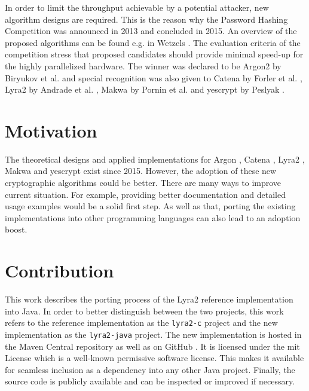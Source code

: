 In order to limit the throughput achievable by a potential attacker, new algorithm designs are required. This is the reason why the Password Hashing Competition was announced in 2013 and concluded in 2015. An overview of the proposed algorithms can be found e.g. in Wetzels \cite{wetzels:2016:phc}. The evaluation criteria of the competition stress that proposed candidates should provide minimal speed-up for the highly parallelized hardware. The winner was declared to be Argon2 by Biryukov et al. \cite{biryukov:2015:argon2} and special recognition was also given to Catena by Forler et al. \cite{forler:2013:catena}, Lyra2 by Andrade et al. \cite{andrade:2016:lyra2,marcos:2015:lyra2}, Makwa by Pornin et al. \cite{pornin:2015:makwa} and yescrypt by Peslyak \cite{peslyak:2015:yescrypt}.

\section{Motivation}
The theoretical designs and applied implementations for Argon \cite{biryukov:2015:argon2}, Catena \cite{forler:2013:catena}, Lyra2 \cite{andrade:2016:lyra2,marcos:2015:lyra2}, Makwa \cite{pornin:2015:makwa} and yescrypt \cite{peslyak:2015:yescrypt} exist since 2015. However, the adoption of these new cryptographic algorithms could be better. There are many ways to improve current situation. For example, providing better documentation and detailed usage examples would be a solid first step. As well as that, porting the existing implementations into other programming languages can also lead to an adoption boost.

\section{Contribution}
This work describes the porting process of the Lyra2 reference implementation into Java. In order to better distinguish between the two projects, this work refers to the reference implementation as the \texttt{lyra2-c} project and the new implementation as the \texttt{lyra2-java} project. The new implementation is hosted in the Maven Central repository \cite{maven:2017:lyra2} as well as on GitHub \cite{github:2017:lyra2-java}. It is licensed under the \gls{mit} License which is a well-known permissive software license. This makes it available for seamless inclusion as a dependency into any other Java project. Finally, the source code is publicly available and can be inspected or improved if necessary.

